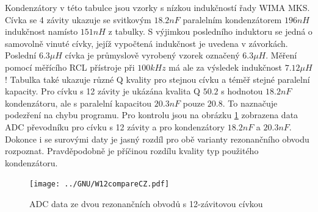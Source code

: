 Kondenzátory v této tabulce jsou vzorky s nízkou indukčností řady WIMA MKS.
Cívka se 4 závity ukazuje se svitkovým \(18.2nF\) paralelním kondenzátorem \(196nH\) indukčnost
namísto \(151nH\)  z tabulky.
S výjimkou posledního induktoru se jedná o samovolně vinuté cívky,
jejíž vypočtená indukčnost je uvedena v závorkách.
Poslední \(6.3\mu H\) cívka je průmyslově vyrobený vzorek označený \(6.3\mu H\).
Měření pomocí měřícího  RCL přístroje při \(100kHz\) má ale za výsledek indukčnost \(7.12\mu H\)!
Tabulka také ukazuje různé Q kvality pro stejnou cívku a téměř stejné paralelní kapacity.
Pro cívku s 12 závity je ukázána kvalita Q \(50.2\) s hodnotou \(18.2nF\) kondenzátoru,
ale s paralelní kapacitou \(20.3nF\) pouze \(20.8\).
To naznačuje podezření na chybu programu.
Pro kontrolu jsou na obrázku \ref{fig:W12compare} zobrazena data ADC převodníku pro
cívku s 12 závity a pro kondenzátory \(18.2nF\) a \(20.3nF\).
Dokonce i se surovými daty je jasný rozdíl pro obě varianty rezonančního obvodu rozpoznat.
Pravděpodobně je  příčinou rozdílu kvality typ použitého kondenzátoru.

\begin{figure}[H]
\centering
\texttt{[image: ../GNU/W12compareCZ.pdf]}
\caption{ ADC data ze dvou rezonančních obvodů s 12-závitovou cívkou}
\label{fig:W12compare}
\end{figure}

